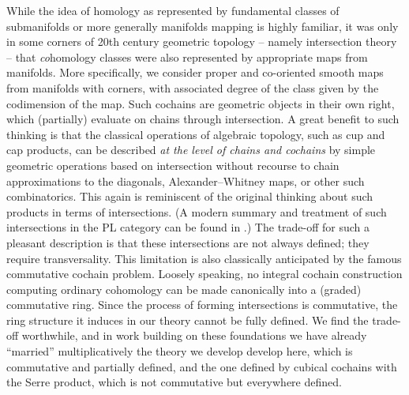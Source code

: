 While the idea of homology as represented by fundamental classes of submanifolds or more generally manifolds mapping is highly familiar, it was only in some corners of 20th century geometric topology -- namely intersection theory --
that \textit{co}homology classes were also represented by appropriate maps from manifolds.
More specifically, we consider proper and co-oriented smooth maps from manifolds with corners, with associated degree of the class given by the codimension of the map.
Such cochains are geometric objects in their own right, which (partially) evaluate on chains through intersection.
A great benefit to such thinking is that the classical operations of algebraic topology, such as cup and cap products, can be described \textit{at the level of chains and cochains} by simple geometric operations based on intersection without recourse to chain approximations to the diagonals, Alexander--Whitney maps, or other such combinatorics.
This again is reminiscent of the original thinking about such products in terms of intersections.
(A modern summary and treatment of such intersections in the PL category can be found in \cite{McC06}.)
The trade-off for such a pleasant description is that these intersections are not always defined; they require transversality.
This limitation is also classically anticipated by the famous commutative cochain problem.
Loosely speaking, no integral cochain construction computing ordinary cohomology can be made canonically into a (graded) commutative ring.
Since the process of forming intersections is commutative, the ring structure it induces in our theory cannot be fully defined.
We find the trade-off worthwhile, and in work building on these foundations \cite{FMS-flows} we have already ``married'' multiplicatively the theory we develop develop here, which is commutative and partially defined, and the one defined by cubical cochains with the Serre product, which is not commutative but everywhere defined.

